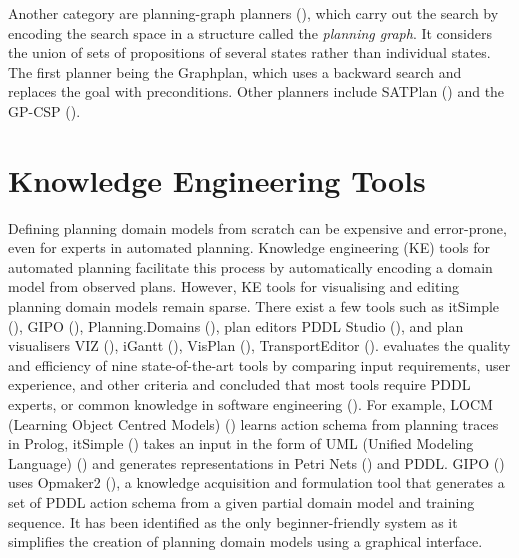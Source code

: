 Another category are planning-graph planners (\cite{blum:97}), which carry out the search by encoding the search space in a structure called the \textit{planning graph}. 
It considers the union of sets of propositions of several states rather than individual states. 
The first planner being the Graphplan, which uses a backward search and replaces the goal with preconditions. 
Other planners include SATPlan (\cite{kautz:06,kautz:99}) and the GP-CSP (\cite{do:01}).

\section{Knowledge Engineering Tools}\label{subsec:Knowledge Engineering}
Defining planning domain models from scratch can be expensive and error-prone, even for experts in automated planning.
Knowledge engineering (KE) tools for automated planning facilitate this process by automatically encoding a domain model from observed plans.
However, KE tools for visualising and editing planning domain models remain sparse.
There exist a few tools such as itSimple (\cite{vaquero2013itsimple}), GIPO (\cite{simpson2007planning}), Planning.Domains (\cite{muise2016planning}), plan editors \eg PDDL Studio (\cite{plch2012inspect}), and plan visualisers \eg VIZ (\cite{vodrazka2010visual}), iGantt (\cite{bartak2009local}), VisPlan (\cite{glinsky2011visplan}), TransportEditor (\cite{vskopek2017transporteditor}).
\cite{jilani2014automated} evaluates the quality and efficiency of nine state-of-the-art tools by comparing input requirements, user experience, and other criteria and concluded that most tools require PDDL experts, or common knowledge in software engineering (\cite{simpson2007planning,vaquero2013itsimple}).
For example, LOCM (Learning Object Centred Models) (\cite{cresswell2013acquiring}) learns action schema from planning traces in Prolog, 
itSimple (\cite{vaquero2013itsimple}) takes an input in the form of UML (Unified Modeling Language) (\cite{omg2005unified}) and generates representations in Petri Nets (\cite{murata1989petri}) and PDDL. 
GIPO (\cite{simpson2007planning}) uses Opmaker2 (\cite{mccluskey2009automated}), a knowledge acquisition and formulation tool that generates a set of PDDL action schema from a given partial domain model and training sequence.
It has been identified as the only beginner-friendly system as it simplifies the creation of planning domain models using a graphical interface.


